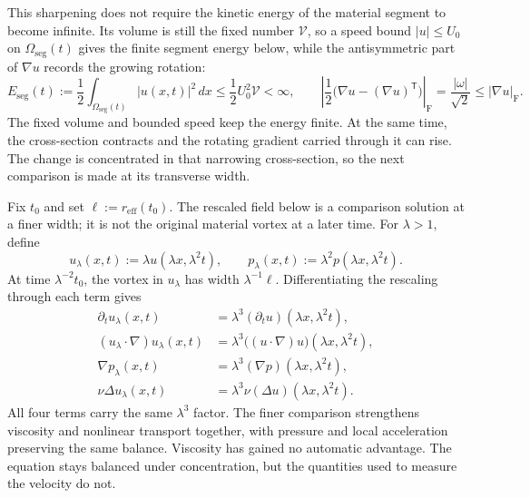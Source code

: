 This sharpening does not require the kinetic energy of the material segment to become infinite.
Its volume is still the fixed number \(\mathcal V\), so a speed bound \(|u|\leq U_0\) on \(\Omega_{\mathrm{seg}}(t)\) gives the finite segment energy below, while the antisymmetric part of \(\nabla u\) records the growing rotation:
\[
  E_{\mathrm{seg}}(t)
  :=
  \frac12\int_{\Omega_{\mathrm{seg}}(t)}|u(x,t)|^2\,dx
  \leq
  \frac12U_0^2\mathcal V
  <
  \infty,
  \qquad
  \left|\frac12\bigl(\nabla u-(\nabla u)^{\mathsf T}\bigr)\right|_{\mathrm F}
  =
  \frac{|\omega|}{\sqrt2}
  \leq
  |\nabla u|_{\mathrm F}.
\]
The fixed volume and bounded speed keep the energy finite.
At the same time, the cross-section contracts and the rotating gradient carried through it can rise.
The change is concentrated in that narrowing cross-section, so the next comparison is made at its transverse width.


Fix \(t_0\) and set \(\ell:=r_{\mathrm{eff}}(t_0)\).
The rescaled field below is a comparison solution at a finer width; it is not the original material vortex at a later time.
For \(\lambda>1\), define
\[
  u_\lambda(x,t)
  :=
  \lambda u(\lambda x,\lambda^2t),
  \qquad
  p_\lambda(x,t)
  :=
  \lambda^2p(\lambda x,\lambda^2t).
\]
At time \(\lambda^{-2}t_0\), the vortex in \(u_\lambda\) has width \(\lambda^{-1}\ell\).
Differentiating the rescaling through each term gives
\[
\begin{aligned}
  \partial_tu_\lambda(x,t)
  &=
  \lambda^3(\partial_tu)(\lambda x,\lambda^2t),
  \\
  (u_\lambda\cdot\nabla)u_\lambda(x,t)
  &=
  \lambda^3\bigl((u\cdot\nabla)u\bigr)(\lambda x,\lambda^2t),
  \\
  \nabla p_\lambda(x,t)
  &=
  \lambda^3(\nabla p)(\lambda x,\lambda^2t),
  \\
  \nu\Delta u_\lambda(x,t)
  &=
  \lambda^3\nu(\Delta u)(\lambda x,\lambda^2t).
\end{aligned}
\]
All four terms carry the same \(\lambda^3\) factor.
The finer comparison strengthens viscosity and nonlinear transport together, with pressure and local acceleration preserving the same balance.
Viscosity has gained no automatic advantage.
The equation stays balanced under concentration, but the quantities used to measure the velocity do not.


